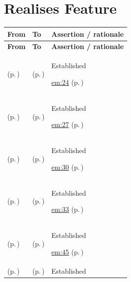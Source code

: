 \section{Realises Feature}
\begingroup\small\setlength{\TableWidth}{\dimexpr\linewidth-6\tabcolsep-4\arrayrulewidth\relax}
\begin{longtable}{|>{\raggedright\arraybackslash}p{0.27\TableWidth}|>{\raggedright\arraybackslash}p{0.27\TableWidth}|>{\raggedright\arraybackslash}p{0.46\TableWidth}|}
\hline\rowcolor{TableHead}\textbf{From} & \textbf{To} & \textbf{Assertion / rationale}\\\hline\endfirsthead
\hline\rowcolor{TableHead}\textbf{From} & \textbf{To} & \textbf{Assertion / rationale}\\\hline\endhead
\hline\endfoot
\nameref{function:resolve-person-identifier} (p.\,\pageref{function:resolve-person-identifier}) & \nameref{feature:feat-em-01} (p.\,\pageref{feature:feat-em-01}) & Established

 \hyperref[rad:em:16]{em:24} (p.\,\pageref{rad:em:16})\\\hline
\nameref{function:correlate-person-identifiers} (p.\,\pageref{function:correlate-person-identifiers}) & \nameref{feature:feat-em-02} (p.\,\pageref{feature:feat-em-02}) & Established

 \hyperref[rad:em:16]{em:27} (p.\,\pageref{rad:em:16})\\\hline
\nameref{function:maintain-person-identity-aliases} (p.\,\pageref{function:maintain-person-identity-aliases}) & \nameref{feature:feat-em-03} (p.\,\pageref{feature:feat-em-03}) & Established

 \hyperref[rad:em:16]{em:30} (p.\,\pageref{rad:em:16})\\\hline
\nameref{function:apply-governed-person-identity-correction} (p.\,\pageref{function:apply-governed-person-identity-correction}) & \nameref{feature:feat-em-04} (p.\,\pageref{feature:feat-em-04}) & Established

 \hyperref[rad:em:16]{em:33} (p.\,\pageref{rad:em:16})\\\hline
\nameref{function:establish-healthcare-subject-context} (p.\,\pageref{function:establish-healthcare-subject-context}) & \nameref{feature:feat-em-05} (p.\,\pageref{feature:feat-em-05}) & Established

 \hyperref[rad:em:41]{em:45} (p.\,\pageref{rad:em:41})\\\hline
\nameref{function:govern-subject-demographic-context} (p.\,\pageref{function:govern-subject-demographic-context}) & \nameref{feature:feat-em-06} (p.\,\pageref{feature:feat-em-06}) & Established


\end{longtable}
